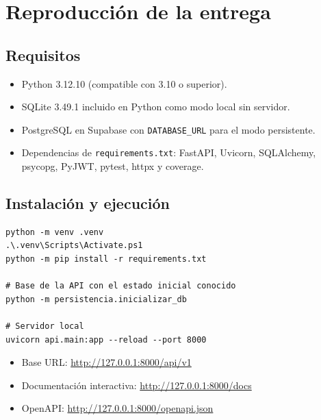 \documentclass[11pt,a4paper]{article}
\newcommand{\code}[1]{\texttt{#1}}
\begin{document}
\clearpage

\section{Reproducción de la entrega}

\subsection{Requisitos}

\begin{itemize}
\item Python 3.12.10 (compatible con 3.10 o superior).
\item SQLite 3.49.1 incluido en Python como modo local sin servidor.
\item PostgreSQL en Supabase con \code{DATABASE_URL} para el modo persistente.
\item Dependencias de \code{requirements.txt}: FastAPI, Uvicorn, SQLAlchemy,
  psycopg, PyJWT, pytest, httpx y coverage.
\end{itemize}

\subsection{Instalación y ejecución}

\begin{lstlisting}
python -m venv .venv
.\.venv\Scripts\Activate.ps1
python -m pip install -r requirements.txt

# Base de la API con el estado inicial conocido
python -m persistencia.inicializar_db

# Servidor local
uvicorn api.main:app --reload --port 8000
\end{lstlisting}

\begin{itemize}
\item Base URL: \url{http://127.0.0.1:8000/api/v1}
\item Documentación interactiva: \url{http://127.0.0.1:8000/docs}
\item OpenAPI: \url{http://127.0.0.1:8000/openapi.json}
\end{itemize}
\end{document}
